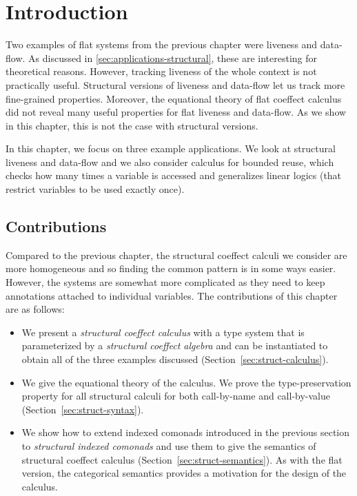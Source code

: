 \section{Introduction}
\label{sec:structural-intro}

Two examples of flat systems from the previous chapter were liveness and data-flow. As discussed
in \ref{sec:applications-structural}, these are interesting for theoretical reasons. However, tracking
liveness of the whole context is not practically useful. Structural versions of liveness and 
data-flow let us track more fine-grained properties. Moreover, the equational theory of flat 
coeffect calculus did not reveal many useful properties for flat liveness and data-flow. 
As we show in this chapter, this is not the case with structural versions.

In this chapter, we focus on three example applications. We look at structural liveness and
data-flow and we also consider calculus for bounded reuse, which checks how many times a variable
is accessed and generalizes linear logics (that restrict variables to be used exactly once).


\subsection{Contributions}

Compared to the previous chapter, the structural coeffect calculi we consider are more 
homogeneous and so finding the common pattern is in some ways easier. However, the systems
are somewhat more complicated as they need to keep annotations attached to individual variables. 
The contributions of this chapter are as follows:

\begin{itemize}
\item We present a \emph{structural coeffect calculus} with a type system that is parameterized by a 
  \emph{structural coeffect algebra} and can be instantiated to obtain all of the three examples
  discussed (Section~\ref{sec:struct-calculus}).
  
\item We give the equational theory of the calculus. We prove the type-preservation property 
  for all structural calculi for both call-by-name and call-by-value (Section~\ref{sec:struct-syntax}). 
  
\item We show how to extend indexed comonads introduced in the previous section to 
  \emph{structural indexed comonads} and use them to give the semantics of structural 
  coeffect calculus (Section~\ref{sec:struct-semantics}). As with the flat version, the
  categorical semantics provides a motivation for the design of the calculus.
\end{itemize}

